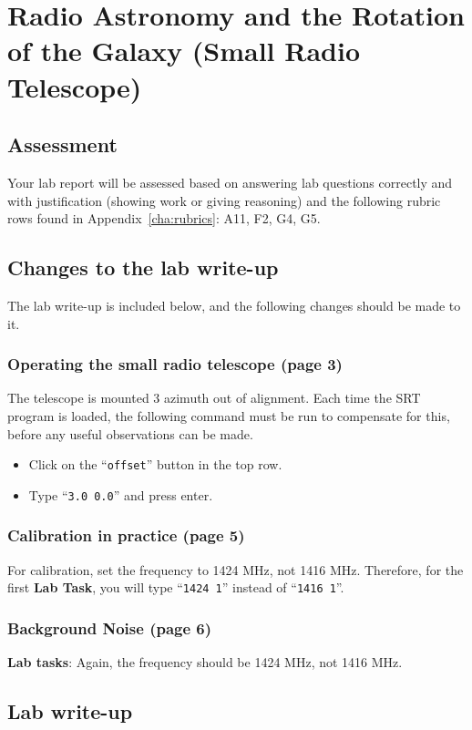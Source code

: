 \chapter{Radio Astronomy and the Rotation of the Galaxy (Small Radio Telescope)}


\section{Assessment}

Your lab report will be assessed based on answering lab questions correctly and with justification (showing work or giving reasoning) and the following rubric rows found in Appendix~\ref{cha:rubrics}: A11, F2, G4, G5.

\section{Changes to the lab write-up}

The lab write-up is included below, and the following changes should be made to it.

\subsection{Operating the small radio telescope (page 3)}

The telescope is mounted 3\textdegree{} azimuth out of alignment. Each time the SRT program is loaded, the following command must be run to compensate for this, before any useful observations can be made.

\begin{itemize}
	\item Click on the ``\texttt{offset}'' button in the top row.
	
	\item Type ``\texttt{3.0 0.0}'' and press enter.
\end{itemize}

\subsection{Calibration in practice (page 5)}

For calibration, set the frequency to 1424 MHz, not 1416 MHz. Therefore, for the first \textbf{Lab Task}, you will type ``\texttt{1424 1}'' instead of ``\texttt{1416 1}''.

\subsection{Background Noise (page 6)}

\textbf{Lab tasks}: Again, the frequency should be 1424 MHz, not 1416 MHz.

\section{Lab write-up}


